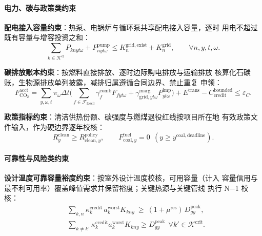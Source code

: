 \paragraph{电力、碳与政策类约束}

\textbf{配电接入容量约束}：热泵、电锅炉与循环泵共享配电接入容量，逐时
用电不超过既有容量与增容投资之和：
\begin{equation}
\label{eq:grid}
\sum_{k\in\mathcal K^{\mathrm{el}}}P_{knyt\omega}
+P^{\mathrm{pump}}_{nyt\omega}
\le K^{\mathrm{grid,exist}}_{n}+K^{\mathrm{grid}}_{n},
\qquad \forall n,y,t,\omega.
\end{equation}

\textbf{碳排放账本约束}：按燃料直接排放、逐时边际购电排放与运输排放
核算化石碳账，生物源排放单列披露，减排归属遵循合同边界、禁止重复
申领：
\begin{equation}
\label{eq:carbon}
F^{\mathrm{acct}}_{\mathrm{CO_2}}
=\sum_{y,\omega,t}\pi_\omega\Delta t\Big(
\sum_{f\in\mathcal F_{\mathrm{fossil}}}
\gamma^{\mathrm{comb}}_{f}F_{fyt\omega}
+\gamma^{\mathrm{marg}}_{\mathrm{grid},yt\omega}
P^{\mathrm{imp}}_{yt\omega}\Big)
+E^{\mathrm{trans}}-C^{\mathrm{bounded}}_{\mathrm{credit}}
\le\varepsilon_C.
\end{equation}

\textbf{政策指标约束}：清洁供热份额、碳强度与燃煤退役红线按项目所在地
有效政策文件输入，作为硬边界逐年校核：
\begin{equation}
\label{eq:policy}
R^{\mathrm{clean}}_{y}\ge R^{\mathrm{policy}}_{\mathrm{clean},y},\qquad
F^{\mathrm{fuel}}_{\mathrm{coal},y}=0\ \ (y\ge y^{\mathrm{coal,deadline}}).
\end{equation}

\paragraph{可靠性与风险类约束}

\textbf{设计温度可靠容量裕度约束}：按室外设计温度校核，可用容量（计入
容量信用与最不利可用率）覆盖峰值需求并保留裕度；关键热源与关键管线
执行 N$-$1 校核：
\begin{equation}
\label{eq:reliability}
\begin{aligned}
&\sum_{k,n}\kappa^{\mathrm{credit}}_{k}\,a^{\mathrm{worst}}_{k}
K_{kny}\ \ge\
(1+\mu^{\mathrm{res}})\,D^{\mathrm{peak}}_{gy},
\\[-2pt]
&\sum_{k\ne k'}\kappa^{\mathrm{credit}}_{k}a^{\mathrm{worst}}_{k}K_{kny}
\ge D^{\mathrm{peak}}_{gy}\ \ \forall k'\in\mathcal K^{\mathrm{crit}}.
\end{aligned}
\end{equation}

